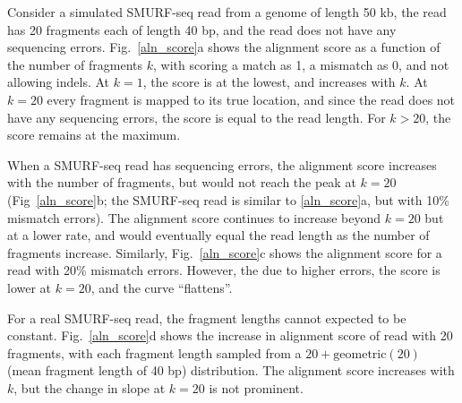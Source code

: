Consider a simulated SMURF-seq read from a genome of length 50 kb, the
read has 20 fragments each of length 40 bp, and the read does not have
any sequencing errors. Fig.~\ref{aln_score}a shows the alignment score
as a function of the number of fragments $k$, with scoring a match as
1, a mismatch as 0, and not allowing indels. At $k=1$, the score is at
the lowest, and increases with $k$. At $k=20$ every fragment is mapped
to its true location, and since the read does not have any sequencing
errors, the score is equal to the read length. For $k > 20$, the score
remains at the maximum.

When a SMURF-seq read has sequencing errors, the alignment score
increases with the number of fragments, but would not reach the peak at
$k=20$ (Fig~\ref{aln_score}b; the SMURF-seq read is similar to
\ref{aln_score}a, but with 10\% mismatch errors). The alignment score
continues to increase beyond $k=20$ but at a lower rate, and would
eventually equal the read length as the number of fragments increase.
Similarly, Fig.~\ref{aln_score}c shows the alignment score for a read
with 20\% mismatch errors. However, the due to higher errors, the score
is lower at $k=20$, and the curve ``flattens''.

For a real SMURF-seq read, the fragment lengths cannot expected to be
constant. Fig.~\ref{aln_score}d shows the increase in alignment score of
read with 20 fragments, with each fragment length sampled from a $20 +
\text{geometric}(20)$ (mean fragment length of 40 bp) distribution. The
alignment score increases with $k$, but the change in slope at $k=20$ is
not prominent.

